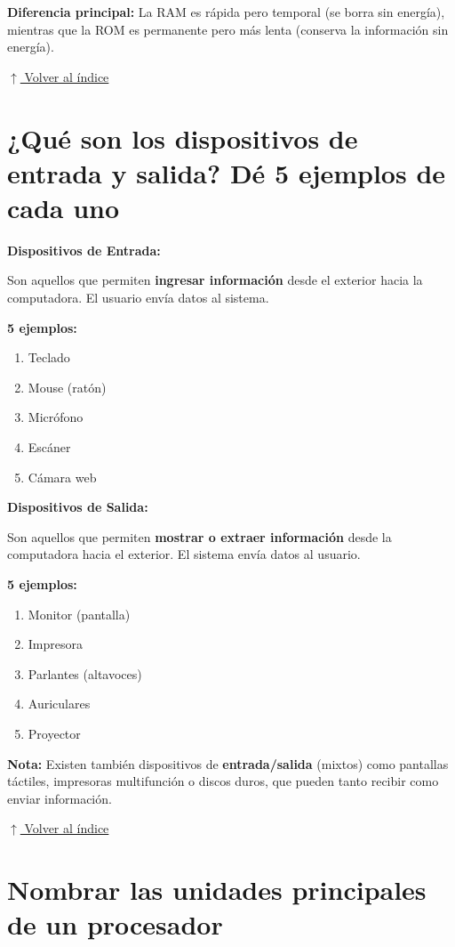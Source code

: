 \documentclass[12pt]{article}
\newcommand{\volverindice}{%
    \vspace{1em}%
    \begin{flushright}%
        \hyperlink{indice}{\small $\uparrow$ Volver al índice}%
    \end{flushright}%
}
\begin{document}
\textbf{Diferencia principal:} La RAM es rápida pero temporal (se borra sin energía), mientras que la ROM es permanente pero más lenta (conserva la información sin energía).

\volverindice
\newpage


\section{¿Qué son los dispositivos de entrada y salida? Dé 5 ejemplos de cada uno}

\textbf{Dispositivos de Entrada:}

Son aquellos que permiten \textbf{ingresar información} desde el exterior hacia la computadora. El usuario envía datos al sistema.

\textbf{5 ejemplos:}
\begin{enumerate}
    \item Teclado
    \item Mouse (ratón)
    \item Micrófono
    \item Escáner
    \item Cámara web
\end{enumerate}

\textbf{Dispositivos de Salida:}

Son aquellos que permiten \textbf{mostrar o extraer información} desde la computadora hacia el exterior. El sistema envía datos al usuario.

\textbf{5 ejemplos:}
\begin{enumerate}
    \item Monitor (pantalla)
    \item Impresora
    \item Parlantes (altavoces)
    \item Auriculares
    \item Proyector
\end{enumerate}

\textbf{Nota:} Existen también dispositivos de \textbf{entrada/salida} (mixtos) como pantallas táctiles, impresoras multifunción o discos duros, que pueden tanto recibir como enviar información.

\volverindice
\newpage


\section{Nombrar las unidades principales de un procesador}
\end{document}
